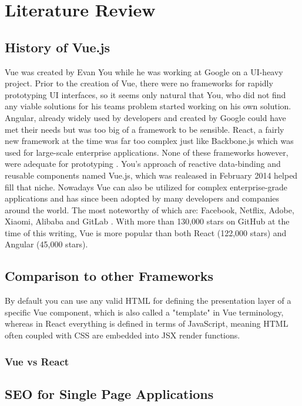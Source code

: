 \chapter[Literature Review]{Literature Review}

\section{History of Vue.js}
Vue was created by Evan You while he was working at Google on a UI-heavy project. Prior to the creation of Vue, there were no frameworks for rapidly prototyping UI interfaces, so it seems only natural that You, who did not find any viable solutions for his teams problem started working on his own solution. Angular, already widely used by developers and created by Google could have met their needs but was too big of a framework to be sensible. React, a fairly new framework at the time was far too complex just like Backbone.js which was used for large-scale enterprise applications. None of these frameworks however, were adequate for prototyping \cite[p.~10]{filipova2016learning}. You's approach of reactive data-binding and reusable components named Vue.js, which was realeased in February 2014 \cite{wiki:Vue} helped fill that niche. Nowadays Vue can also be utilized for complex enterprise-grade applications and has since been adopted by many developers and companies around the world. The most noteworthy of which are: Facebook, Netflix, Adobe, Xiaomi, Alibaba and GitLab \cite{CompaniesUsingVue:online}. With more than 130,000 stars on GitHub at the time of this writing, Vue is more popular than both React (122,000 stars) and Angular (45,000 stars).


\section{Comparison to other Frameworks}
By default you can use any valid HTML for defining the presentation layer of a specific Vue component, which is also called a "template" in Vue terminology, whereas in React everything is defined in terms of JavaScript, meaning HTML often coupled with CSS are embedded into JSX render functions.
\subsection{Vue vs React}


\section{SEO for Single Page Applications}
